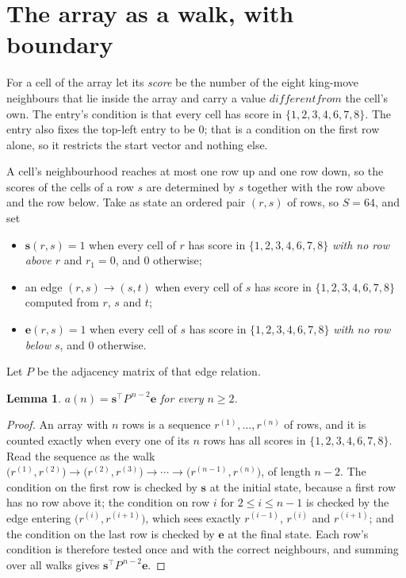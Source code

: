 \documentclass[11pt,a4paper]{article}
\theoremstyle{plain}
\newtheorem{lemma}[theorem]{Lemma}
\theoremstyle{definition}
\begin{document}
\section{The array as a walk, with boundary}

For a cell of the array let its \emph{score} be the number of the eight king-move neighbours that lie inside
the array and carry a value $different from$ the cell's own. The entry's condition is that every cell
has score in $\{1,2,3,4,6,7,8\}$. The entry also fixes the top-left entry to be $0$; that is a condition on the first row alone, so it restricts the start vector and nothing else.

A cell's neighbourhood reaches at most one row up and one row down, so the scores of the
cells of a row $s$ are determined by $s$ together with the row above and the row below.
Take as state an ordered pair $(r,s)$ of rows, so $S=64$, and set
\begin{itemize}
\item $\mathbf{s}(r,s)=1$ when every cell of $r$ has score in $\{1,2,3,4,6,7,8\}$ \emph{with no row
above $r$} and $r_1=0$, and $0$ otherwise;
\item an edge $(r,s)\to(s,t)$ when every cell of $s$ has score in $\{1,2,3,4,6,7,8\}$ computed from
$r$, $s$ and $t$;
\item $\mathbf{e}(r,s)=1$ when every cell of $s$ has score in $\{1,2,3,4,6,7,8\}$ \emph{with no row
below $s$}, and $0$ otherwise.
\end{itemize}
Let $P$ be the adjacency matrix of that edge relation.

\begin{lemma}\label{lem:walk}
$a(n)=\mathbf{s}^{\!\top}P^{\,n-2}\mathbf{e}$ for every $n\ge2$.
\end{lemma}

\begin{proof}
An array with $n$ rows is a sequence $r^{(1)},\dots,r^{(n)}$ of rows, and it is counted
exactly when every one of its $n$ rows has all scores in $\{1,2,3,4,6,7,8\}$. Read the sequence as the
walk $\bigl(r^{(1)},r^{(2)}\bigr)\to\bigl(r^{(2)},r^{(3)}\bigr)\to\cdots\to
\bigl(r^{(n-1)},r^{(n)}\bigr)$, of length $n-2$. The condition on the first row is
checked by $\mathbf{s}$ at the initial state, because a first row has no row above it; the
condition on row $i$ for $2\le i\le n-1$ is checked by the edge entering
$\bigl(r^{(i)},r^{(i+1)}\bigr)$, which sees exactly $r^{(i-1)}$, $r^{(i)}$ and
$r^{(i+1)}$; and the condition on the last row is checked by $\mathbf{e}$ at the final
state. Each row's condition is therefore tested once and with the correct neighbours, and
summing over all walks gives $\mathbf{s}^{\!\top}P^{\,n-2}\mathbf{e}$.
\end{proof}
\end{document}
